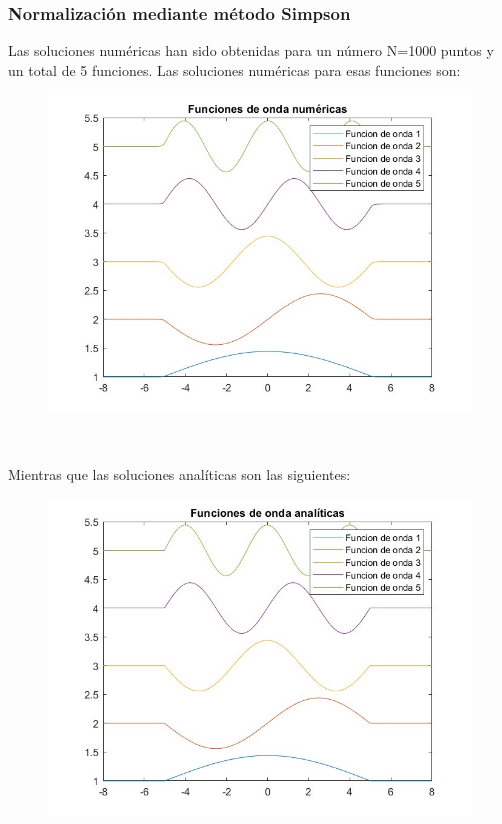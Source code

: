 \documentclass[12pt]{article}
\begin{document}
\subsubsection{Normalización mediante método Simpson}
Las soluciones numéricas han sido obtenidas para un número 
N=1000 puntos y un total de 5 funciones. Las soluciones numéricas
para esas funciones son: 
\begin{figure}[h]
    \centering
    \includegraphics[scale=0.5]{numericas.jpg}
\end{figure} \\
\par
Mientras que las soluciones analíticas son las siguientes:
\newpage
\begin{figure}[h]
    \centering
    \includegraphics[scale=0.5]{analiticas.jpg}
\end{figure} 
\end{document}
